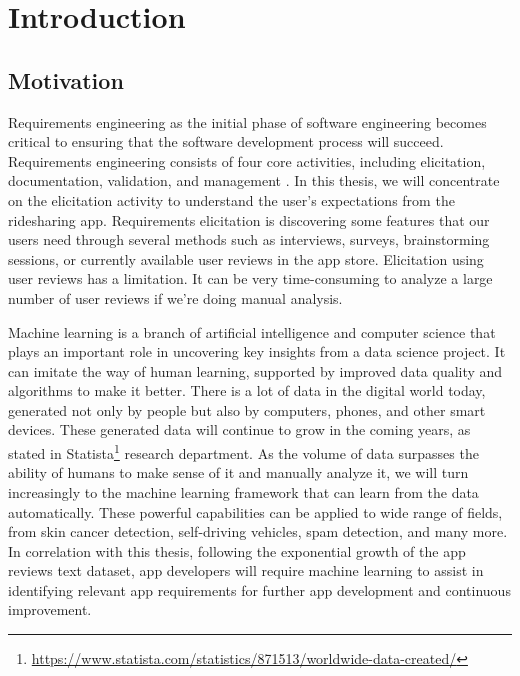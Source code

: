 \documentclass[12pt]{article}
\begin{document}
\newpage
\tableofcontents

\newpage
\listoffigures

\newpage
\listoftables

\newpage
\section{Introduction}
\subsection{Motivation}
Requirements engineering as the initial phase of software engineering becomes critical to ensuring that the software development process will succeed. Requirements engineering consists of four core activities, including elicitation, documentation, validation, and management \cite{re_fundamentals}. In this thesis, we will concentrate on the elicitation activity to understand the user’s expectations from the ridesharing app. Requirements elicitation is discovering some features that our users need through several methods such as interviews, surveys, brainstorming sessions, or currently available user reviews in the app store. Elicitation using user reviews has a limitation. It can be very time-consuming to analyze a large number of user reviews if we’re doing manual analysis.

Machine learning is a branch of artificial intelligence and computer science that plays an important role in uncovering key insights from a data science project. It can imitate the way of human learning, supported by improved data quality and algorithms to make it better. There is a lot of data in the digital world today, generated not only by people but also by computers, phones, and other smart devices. These generated data will continue to grow in the coming years, as stated in Statista\footnote{\url{https://www.statista.com/statistics/871513/worldwide-data-created/}} research department. As the volume of data surpasses the ability of humans to make sense of it and manually analyze it, we will turn increasingly to the machine learning framework that can learn from the data automatically. These powerful capabilities can be applied to wide range of fields, from skin cancer detection\cite{skin_cancer_detection}, self-driving vehicles\cite{ml_for_selfdriving_car}, spam detection\cite{ml_for_spam_detection}, and many more. In correlation with this thesis, following the exponential growth of the app reviews text dataset, app developers will require machine learning to assist in identifying relevant app requirements for further app development and continuous improvement.
\end{document}
